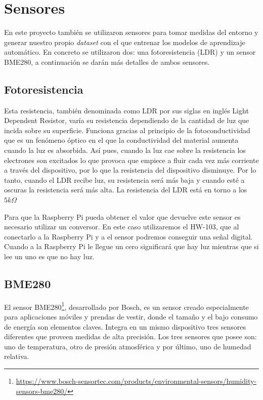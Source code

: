 \documentclass[a4paper, 12pt]{book}
\begin{document}
\section{Sensores}
\label{sec:sensores}

En este proyecto también se utilizaron sensores para tomar medidas del entorno y generar nuestro propio \textit{dataset} con el que entrenar los modelos de aprendizaje automático. En concreto se utilizaron dos: una fotoresistencia (LDR) y un sensor BME280, a continuación se darán más detalles de ambos sensores.

\subsection{Fotoresistencia}
\label{subsec:fotoresistencia}

Esta resistencia, también denominada como LDR por sus siglas en inglés Light Dependent Resistor, varía su resistencia dependiendo de la cantidad de luz que incida sobre su superficie. Funciona gracias al principio de la fotoconductividad que es un fenómeno óptico en el que la conductividad del material aumenta cuando la luz es absorbida. Así pues, cuando la luz cae sobre la resistencia los electrones son excitados lo que provoca que empiece a fluir cada vez más corriente a través del dispositivo, por lo que la resistencia del dispositivo disminuye. Por lo tanto, cuando el LDR recibe luz, su resistencia será más baja y cuando esté a oscuras la resistencia será más alta. La resistencia del LDR está en torno a los $5 k\Omega$

Para que la Raspberry Pi pueda obtener el valor que devuelve este sensor es necesario utilizar un conversor. En este caso utilizaremos el HW-103, que al conectarlo a la Raspberry Pi y a el sensor podremos conseguir una señal digital. Cuando a la Raspberry Pi le llegue un cero significará que hay luz mientras que si lee un uno es que no hay luz.

\subsection{BME280}
\label{subsec:bme280}

El sensor BME280\footnote{\url{https://www.bosch-sensortec.com/products/environmental-sensors/humidity-sensors-bme280/}}, desarrollado por Bosch, es un sensor creado especialmente para aplicaciones móviles y prendas de vestir, donde el tamaño y el bajo consumo de energía son elementos claves. Integra en un mismo dispositivo tres sensores diferentes que proveen medidas de alta precisión. Los tres sensores que posee son: uno de temperatura, otro de presión atmosférica y por último, uno de humedad relativa. 
\end{document}
